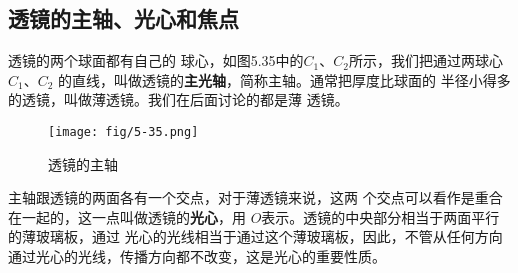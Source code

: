 \subsection{透镜的主轴、光心和焦点}

透镜的两个球面都有自己的
球心，如图5.35中的$C_1$、$C_2$所示，我们把通过两球心$C_1$、$C_2$
的直线，叫做透镜的\textbf{主光轴}，简称主轴。通常把厚度比球面的
半径小得多的透镜，叫做薄透镜。我们在后面讨论的都是薄
透镜。
\begin{figure}[htp]\centering
    \texttt{[image: fig/5-35.png]}
    \caption{透镜的主轴}
    \end{figure}

主轴跟透镜的两面各有一个交点，对于薄透镜来说，这两
个交点可以看作是重合在一起的，这一点叫做透镜的\textbf{光心}，用
$O$表示。透镜的中央部分相当于两面平行的薄玻璃板，通过
光心的光线相当于通过这个薄玻璃板，因此，不管从任何方向
通过光心的光线，传播方向都不改变，这是光心的重要性质。

